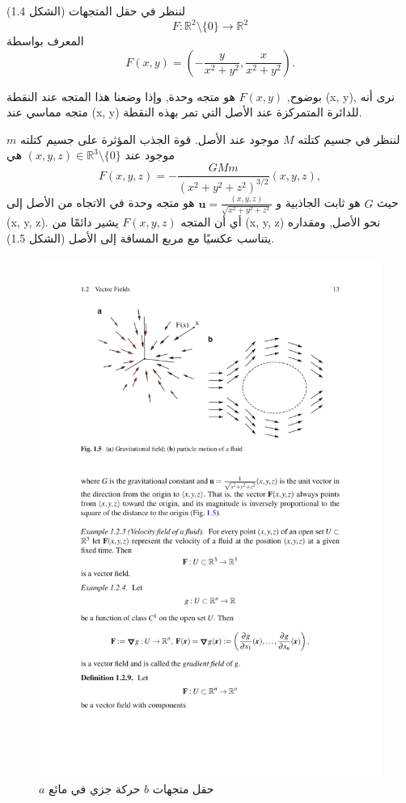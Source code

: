 \begin{exemple}
لننظر في حقل المتجهات (الشكل 1.4)
\[ F : \mathbb{R}^2 \setminus \{0\} \to \mathbb{R}^2 \]
المعرف بواسطة
\[ F(x, y) = \left( -\frac{y}{x^2 + y^2}, \frac{x}{x^2 + y^2} \right). \]

بوضوح, \( F(x, y) \) هو متجه وحدة, وإذا وضعنا هذا المتجه عند النقطة (x, y), نرى أنه متجه مماسي عند (x, y) للدائرة المتمركزة عند الأصل التي تمر بهذه النقطة.
\end{exemple}

\begin{exemple}
لننظر في جسيم كتلته \( M \) موجود عند الأصل. قوة الجذب المؤثرة على جسيم كتلته \( m \) موجود عند \( (x, y, z) \in \mathbb{R}^3 \setminus \{0\} \) هي
\[ F(x, y, z) = - \frac{GMm}{(x^2 + y^2 + z^2)^{3/2}} (x, y, z), \]
حيث \( G \) هو ثابت الجاذبية و \( \mathbf{u} = \frac{(x, y, z)}{\sqrt{x^2 + y^2 + z^2}} \) هو متجه وحدة في الاتجاه من الأصل إلى (x, y, z). أي أن المتجه \( F(x, y, z) \) يشير دائمًا من (x, y, z) نحو الأصل, ومقداره يتناسب عكسيًا مع مربع المسافة إلى الأصل (الشكل 1.5).
\end{exemple}

\begin{figure}
    \centering
    \includegraphics[width=0.8\linewidth]{Gravitational field.pdf}
    \caption{$a$  حقل متجهات        $b$ حركة جزي في مائع}
    \label{fig:enter-label}
\end{figure}

